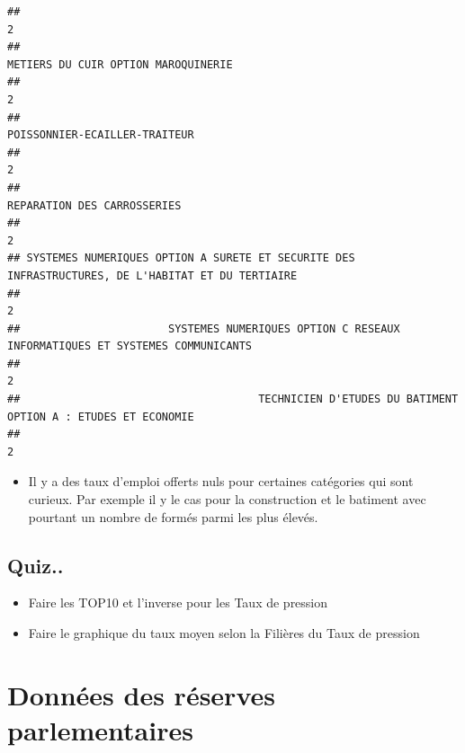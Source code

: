 \documentclass[
]{book}
\providecommand{\tightlist}{%
  \setlength{\itemsep}{0pt}\setlength{\parskip}{0pt}}
\begin{document}
\begin{verbatim}
##                                                                                                 2 
##                                                               METIERS DU CUIR OPTION MAROQUINERIE 
##                                                                                                 2 
##                                                                     POISSONNIER-ECAILLER-TRAITEUR 
##                                                                                                 2 
##                                                                       REPARATION DES CARROSSERIES 
##                                                                                                 2 
## SYSTEMES NUMERIQUES OPTION A SURETE ET SECURITE DES INFRASTRUCTURES, DE L'HABITAT ET DU TERTIAIRE 
##                                                                                                 2 
##                       SYSTEMES NUMERIQUES OPTION C RESEAUX INFORMATIQUES ET SYSTEMES COMMUNICANTS 
##                                                                                                 2 
##                                     TECHNICIEN D'ETUDES DU BATIMENT OPTION A : ETUDES ET ECONOMIE 
##                                                                                                 2
\end{verbatim}

\begin{itemize}
\tightlist
\item
  Il y a des taux d'emploi offerts nuls pour certaines catégories qui sont curieux.
  Par exemple il y le cas pour la construction et le batiment avec pourtant un
  nombre de formés parmi les plus élevés.
\end{itemize}

\hypertarget{quiz..}{%
\section{Quiz..}\label{quiz..}}

\begin{itemize}
\item
  Faire les TOP10 et l'inverse pour les Taux de pression
\item
  Faire le graphique du taux moyen selon la Filières du Taux de pression
\end{itemize}

\hypertarget{donnuxe9es-des-ruxe9serves-parlementaires}{%
\chapter{Données des réserves parlementaires}\label{donnuxe9es-des-ruxe9serves-parlementaires}}
\end{document}
